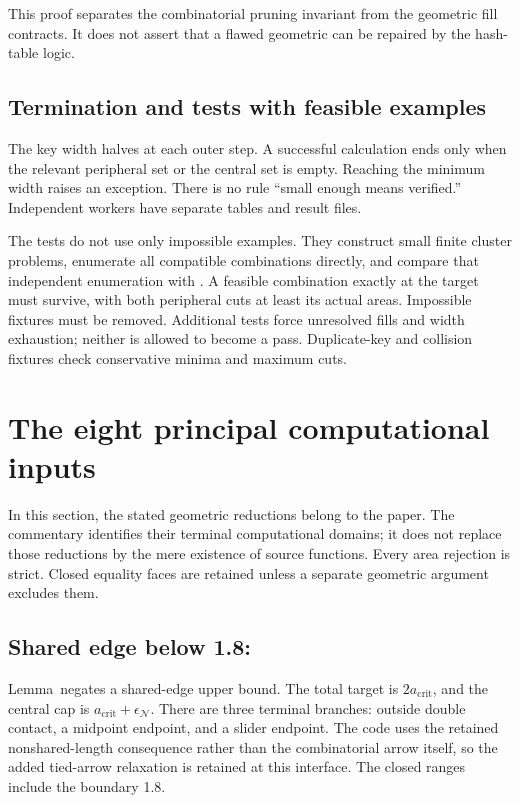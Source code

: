 \documentclass[11pt,a4paper]{article}
\newcommand{\code}[1]{\texttt{\detokenize{#1}}}
\newcommand{\ak}{a_{\mathrm{crit}}}\newcommand{\amin}{a_{\min}}
\newcommand{\eN}{\epsilon_{\mathcal N}}\newcommand{\eM}{\epsilon_{\mathcal M}}
\theoremstyle{remark}\newtheorem*{contract}{Implementation contract}\newtheorem*{auditnote}{Audit note}
\begin{document}
This proof separates the combinatorial pruning invariant from the geometric
fill contracts. It does not assert that a flawed geometric \code{None} can be
repaired by the hash-table logic.

\subsection{Termination and tests with feasible examples}
The key width halves at each outer step. A successful calculation ends only
when the relevant peripheral set or the central set is empty. Reaching the
minimum width raises an exception. There is no rule ``small enough means
verified.'' Independent workers have separate tables and result files.

The tests do not use only impossible examples. They construct small finite
cluster problems, enumerate all compatible combinations directly, and
compare that independent enumeration with \code{mk_one_cencoord}. A feasible
combination exactly at the target must survive, with both peripheral cuts at
least its actual areas. Impossible fixtures must be removed. Additional tests
force unresolved fills and width exhaustion; neither is allowed to become a
pass. Duplicate-key and collision fixtures check conservative minima and
maximum cuts.

\section{The eight principal computational inputs}

In this section, the stated geometric reductions belong to the paper.
The commentary identifies their terminal computational domains; it does not
replace those reductions by the mere existence of source functions. Every
area rejection is strict. Closed equality faces are retained unless a
separate geometric argument excludes them.

\subsection{Shared edge below 1.8: \code{NKQNXUN}}
Lemma~\PaperPseudoOne negates a shared-edge upper bound. The total target is
$2\ak$, and the central cap is $\ak+\eN$. There are three terminal
branches: outside double contact, a midpoint endpoint, and a slider endpoint.
The code uses the retained nonshared-length consequence rather than the
combinatorial arrow itself, so the added tied-arrow relaxation is retained
at this interface. The closed ranges include the boundary 1.8.
\end{document}
